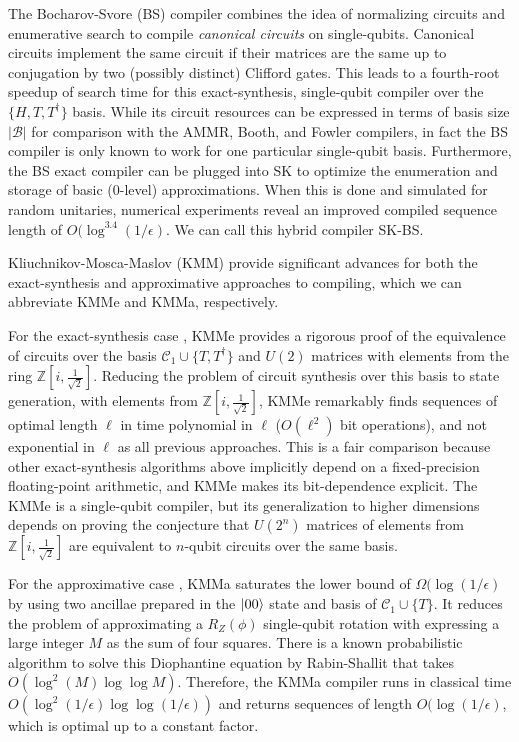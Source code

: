 The Bocharov-Svore (BS) compiler combines the idea of normalizing circuits
and enumerative search to compile \emph{canonical circuits} on single-qubits.
Canonical circuits
implement the same circuit if their matrices are the same up to
conjugation by two (possibly distinct) Clifford gates. This leads to
a fourth-root speedup of search time for this exact-synthesis, single-qubit
compiler over the $\{H, T, T^{\dagger} \}$ basis. While its circuit resources
can be expressed in terms of basis size $|\mathcal{B}|$ for comparison with
the AMMR, Booth, and Fowler compilers, in fact the BS compiler is only known
to work for one particular single-qubit basis. Furthermore, the BS exact
compiler can be plugged into SK to optimize the enumeration and storage of
basic (0-level) approximations. When this is done and simulated for
random unitaries, numerical experiments reveal an improved compiled
sequence length of $O(\log^{3.4}(1/\epsilon)$. We can call this hybrid
compiler SK-BS.

Kliuchnikov-Mosca-Maslov (KMM) provide significant advances for both the
exact-synthesis and approximative approaches to compiling, which we can
abbreviate KMMe and KMMa, respectively.

For the
exact-synthesis case \cite{Kliuchnikov2012e},
KMMe provides a rigorous proof of the equivalence
of circuits over the basis $\mathcal{C}_1 \cup \{T, T^{\dagger} \}$ and $U(2)$ matrices
with elements from the ring $\mathbb{Z}\left[i,\frac{1}{\sqrt{2}}\right]$.
Reducing the problem of circuit synthesis over this basis to state
generation, with elements from $\mathbb{Z}\left[i,\frac{1}{\sqrt{2}}\right]$,
KMMe remarkably finds sequences of optimal length $\ell$ in time
polynomial in $\ell$
($O(\ell ^2)$ bit operations), and not exponential in $\ell$ as
all previous approaches. This is a fair comparison because other 
exact-synthesis algorithms above implicitly
depend on a fixed-precision floating-point
arithmetic, and KMMe makes its bit-dependence explicit. The KMMe is
a single-qubit compiler, but its generalization to higher dimensions
depends on proving the conjecture that
$U(2^n)$ matrices of elements from $\mathbb{Z}\left[i,\frac{1}{\sqrt{2}}\right]$
are equivalent to $n$-qubit circuits over the same basis.

For the approximative case \cite{Kliuchnikov2012a}, KMMa saturates the lower
bound of $\Omega(\log(1/\epsilon)$ by using two ancillae prepared in the
$\left\vert{00}\right\rangle$ state and basis of $\mathcal{C}_1 \cup \{ T \}$.
It reduces the problem of approximating a
$R_Z(\phi)$ single-qubit rotation with expressing a large integer $M$ as the
sum of four squares. There is a known probabilistic algorithm to
solve this Diophantine equation
by Rabin-Shallit \cite{Rabin1985} that takes $O(\log^2(M)\log\log M)$. Therefore,
the KMMa compiler runs in classical time $O(\log^2(1/\epsilon)\log\log(1/\epsilon))$
and returns sequences of length $O(\log(1/\epsilon)$, which is optimal up to
a constant factor.

